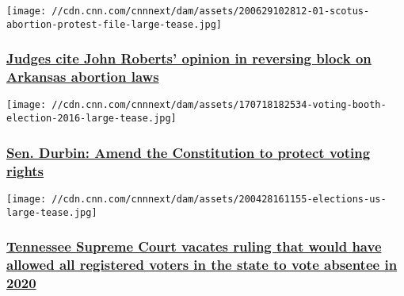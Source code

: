 \href{/2020/08/07/politics/abortion-arkansas-john-roberts/index.html}{}

\texttt{[image: //cdn.cnn.com/cnnnext/dam/assets/200629102812-01-scotus-abortion-protest-file-large-tease.jpg]}

\hypertarget{judges-cite-john-roberts-opinion-in-reversing-block-on-arkansas-abortion-laws}{%
\subsubsection{\texorpdfstring{\href{/2020/08/07/politics/abortion-arkansas-john-roberts/index.html}{Judges
cite John Roberts' opinion in reversing block on Arkansas abortion
laws}}{Judges cite John Roberts' opinion in reversing block on Arkansas abortion laws}}\label{judges-cite-john-roberts-opinion-in-reversing-block-on-arkansas-abortion-laws}}

\href{/2020/08/06/opinions/amend-constitution-protect-voting-rights-durbin/index.html}{}

\texttt{[image: //cdn.cnn.com/cnnnext/dam/assets/170718182534-voting-booth-election-2016-large-tease.jpg]}

\hypertarget{sen-durbin-amend-the-constitution-to-protect-voting-rights}{%
\subsubsection{\texorpdfstring{\href{/2020/08/06/opinions/amend-constitution-protect-voting-rights-durbin/index.html}{Sen.
Durbin: Amend the Constitution to protect voting
rights}}{Sen. Durbin: Amend the Constitution to protect voting rights}}\label{sen-durbin-amend-the-constitution-to-protect-voting-rights}}

\href{/2020/08/06/politics/tennessee-vote-absentee/index.html}{}

\texttt{[image: //cdn.cnn.com/cnnnext/dam/assets/200428161155-elections-us-large-tease.jpg]}

\hypertarget{tennessee-supreme-court-vacates-ruling-that-would-have-allowed-all-registered-voters-in-the-state-to-vote-absentee-in-2020}{%
\subsubsection{\texorpdfstring{\href{/2020/08/06/politics/tennessee-vote-absentee/index.html}{Tennessee
Supreme Court vacates ruling that would have allowed all registered
voters in the state to vote absentee in
2020}}{Tennessee Supreme Court vacates ruling that would have allowed all registered voters in the state to vote absentee in 2020}}\label{tennessee-supreme-court-vacates-ruling-that-would-have-allowed-all-registered-voters-in-the-state-to-vote-absentee-in-2020}}

